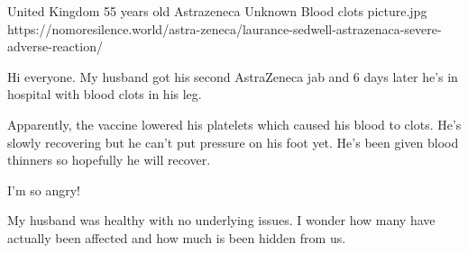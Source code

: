           {United Kingdom}
          {55 years old}
          {Astrazeneca}
          {Unknown}
          {Blood clots}
          {picture.jpg}
          {https://nomoresilence.world/astra-zeneca/laurance-sedwell-astrazenaca-severe-adverse-reaction/}
          {
            
Hi everyone. My husband got his second AstraZeneca jab and 6 days later he’s in
hospital with blood clots in his leg.

Apparently, the vaccine lowered his platelets which caused his blood to
clots. He’s slowly recovering but he can’t put pressure on his foot yet. He’s
been given blood thinners so hopefully he will recover.

I’m so angry!

My husband was healthy with no underlying issues. I wonder how many have
actually been affected and how much is been hidden from us.

}
